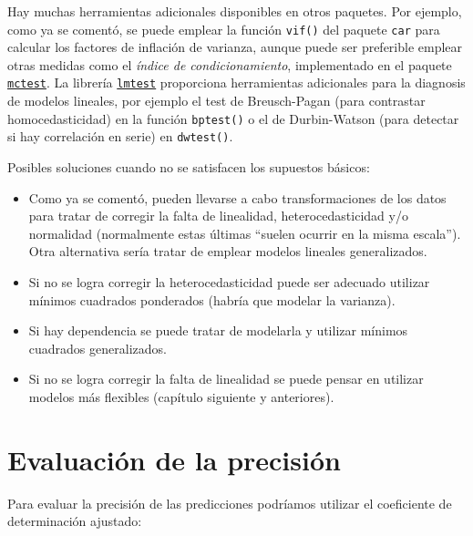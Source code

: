 \documentclass[
  spanish,
]{book}
\newenvironment{Shaded}{\begin{snugshade}}{\end{snugshade}}
\newcommand{\KeywordTok}[1]{\textcolor[rgb]{0.13,0.29,0.53}{\textbf{#1}}}
\newcommand{\NormalTok}[1]{#1}
\newcommand{\OperatorTok}[1]{\textcolor[rgb]{0.81,0.36,0.00}{\textbf{#1}}}
\theoremstyle{break}
\theoremstyle{definition}
\theoremstyle{definition}
\theoremstyle{definition}
\theoremstyle{remark}
\begin{document}
Hay muchas herramientas adicionales disponibles en otros paquetes.
Por ejemplo, como ya se comentó, se puede emplear la función
\texttt{vif()} del paquete \texttt{car} para calcular los factores de inflación de varianza,
aunque puede ser preferible emplear otras medidas como el \emph{índice de condicionamiento},
implementado en el paquete \href{https://CRAN.R-project.org/package=mctest}{\texttt{mctest}}.
La librería \href{https://CRAN.R-project.org/package=lmtest}{\texttt{lmtest}} proporciona herramientas adicionales para la diagnosis de modelos lineales,
por ejemplo el test de Breusch-Pagan (para contrastar homocedasticidad) en la función \texttt{bptest()}
o el de Durbin-Watson (para detectar si hay correlación en serie) en \texttt{dwtest()}.

Posibles soluciones cuando no se satisfacen los supuestos básicos:

\begin{itemize}
\item
  Como ya se comentó, pueden llevarse a cabo transformaciones de los datos para tratar de
  corregir la falta de linealidad, heterocedasticidad y/o normalidad
  (normalmente estas últimas ``suelen ocurrir en la misma escala'').
  Otra alternativa sería tratar de emplear modelos lineales generalizados.
\item
  Si no se logra corregir la heterocedasticidad puede ser adecuado
  utilizar mínimos cuadrados ponderados (habría que modelar la varianza).
\item
  Si hay dependencia se puede tratar de modelarla y utilizar mínimos
  cuadrados generalizados.
\item
  Si no se logra corregir la falta de linealidad se puede pensar en
  utilizar modelos más flexibles (capítulo siguiente y anteriores).
\end{itemize}

\hypertarget{evaluaciuxf3n-de-la-precisiuxf3n}{%
\section{Evaluación de la precisión}\label{evaluaciuxf3n-de-la-precisiuxf3n}}

Para evaluar la precisión de las predicciones podríamos utilizar el coeficiente de determinación ajustado:

\begin{Shaded}
\end{Shaded}
\end{document}
